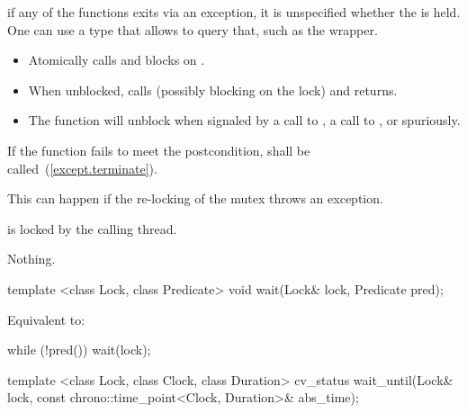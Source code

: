 \begin{itemdescr}
\pnum
\realnote if any of the  functions exits via an exception, it is
unspecified whether the  is held. One can use a  type
that allows to query that, such as the  wrapper.

\pnum
\effects
\begin{itemize}
\item Atomically calls  and blocks on .
\item When unblocked, calls  (possibly blocking on the lock) and returns.
\item The function will unblock when signaled by a call to ,
a call to , or spuriously.
\end{itemize}

\pnum
\remarks
If the function fails to meet the postcondition, 
shall be called~(\ref{except.terminate}).
\begin{note} This can happen if the re-locking of the mutex throws an exception. \end{note}

\pnum\postcondition {} is locked by the calling thread.

\pnum\throws Nothing.

\end{itemdescr}

%
%
\begin{itemdecl}
template <class Lock, class Predicate>
  void wait(Lock& lock, Predicate pred);
\end{itemdecl}

\begin{itemdescr}
\pnum
\effects Equivalent to:
\begin{codeblock}
while (!pred())
  wait(lock);
\end{codeblock}
\end{itemdescr}

%
%
\begin{itemdecl}
template <class Lock, class Clock, class Duration>
  cv_status wait_until(Lock& lock, const chrono::time_point<Clock, Duration>& abs_time);
\end{itemdecl}

